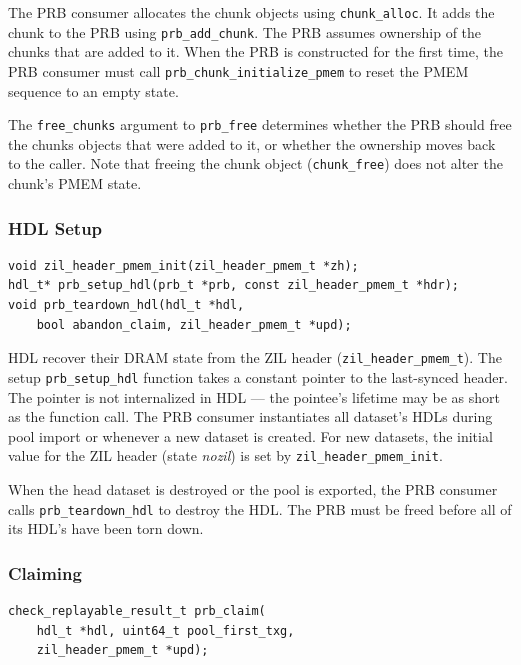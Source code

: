 \documentclass[12pt,a4paper,twoside]{book}
\begin{document}
The PRB consumer allocates the chunk objects using \lstinline{chunk_alloc}.
It adds the chunk to the PRB using \lstinline{prb_add_chunk}.
The PRB assumes ownership of the chunks that are added to it.
When the PRB is constructed for the first time, the PRB consumer must call \lstinline{prb_chunk_initialize_pmem} to reset the PMEM sequence to an empty state.

The \lstinline{free_chunks} argument to \lstinline{prb_free} determines whether the PRB should free the chunks objects that were added to it, or whether the ownership moves back to the caller.
Note that freeing the chunk object (\lstinline{chunk_free}) does not alter the chunk's PMEM state.

\subsubsection{HDL Setup}\label{di:prb:api:hdl}
\begin{lstlisting}
void zil_header_pmem_init(zil_header_pmem_t *zh);
hdl_t* prb_setup_hdl(prb_t *prb, const zil_header_pmem_t *hdr);
void prb_teardown_hdl(hdl_t *hdl,
    bool abandon_claim, zil_header_pmem_t *upd);
\end{lstlisting}

HDL recover their DRAM state from the ZIL header (\lstinline{zil_header_pmem_t}).
The setup \lstinline{prb_setup_hdl} function takes a constant pointer to the last-synced header.
The pointer is not internalized in HDL --- the pointee's lifetime may be as short as the function call.
The PRB consumer instantiates all dataset's HDLs during pool import or whenever a new dataset is created.
For new datasets, the initial value for the ZIL header (state \textit{nozil}) is set by \lstinline{zil_header_pmem_init}.

When the head dataset is destroyed or the pool is exported, the PRB consumer calls \lstinline{prb_teardown_hdl} to destroy the HDL.
The PRB must be freed before all of its HDL's have been torn down.

\subsubsection{Claiming}\label{di:prb:api:claiming}

\begin{lstlisting}
check_replayable_result_t prb_claim(
    hdl_t *hdl, uint64_t pool_first_txg,
    zil_header_pmem_t *upd);
\end{lstlisting}
\end{document}
